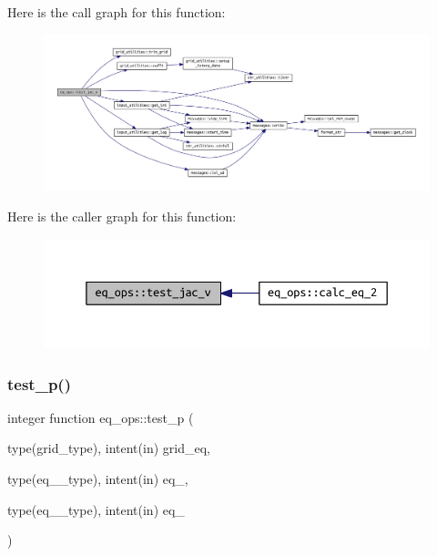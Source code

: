 Here is the call graph for this function\+:
\nopagebreak
\begin{figure}[H]
\begin{center}
\leavevmode
\includegraphics[width=350pt]{namespaceeq__ops_aef40d04e93f6a96576f8fe893fb086f8_cgraph}
\end{center}
\end{figure}
Here is the caller graph for this function\+:
\nopagebreak
\begin{figure}[H]
\begin{center}
\leavevmode
\includegraphics[width=350pt]{namespaceeq__ops_aef40d04e93f6a96576f8fe893fb086f8_icgraph}
\end{center}
\end{figure}
\mbox{\label{namespaceeq__ops_a38b723f6ed5d2e2772c9c3ad14d5ffd4}} 
\subsubsection{\texorpdfstring{test\+\_\+p()}{test\_p()}}
{\footnotesize\ttfamily integer function eq\+\_\+ops\+::test\+\_\+p (\begin{DoxyParamCaption}\item[{type(grid\+\_\+type), intent(in)}]{grid\+\_\+eq,  }\item[{type(eq\+\_\+1\+\_\+type), intent(in)}]{eq\+\_,  }\item[{type(eq\+\_\+2\+\_\+type), intent(in)}]{eq\+\_ }\end{DoxyParamCaption})}



